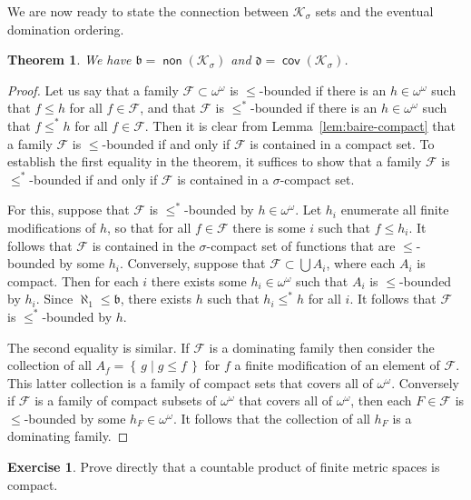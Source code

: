 \documentclass[11pt,oneside]{amsbook}
\newcommand{\set}[1]{\left\{\,#1\,\right\}}
\newcommand{\Ksigma}{\mathcal K_\sigma}
\DeclareMathOperator{\non}{\mathsf{non}}
\DeclareMathOperator{\cov}{\mathsf{cov}}
\theoremstyle{definition}
\newtheorem{exerc}{Exercise}[section]
\theoremstyle{plain}
\newtheorem{thm}{Theorem}[section]
\theoremstyle{definition}
\theoremstyle{remark}
\numberwithin{equation}{section}
\numberwithin{figure}{section}
\begin{document}
We are now ready to state the connection between $\Ksigma$ sets and the eventual domination ordering.

\begin{thm}
  \label{thm:bd-vs-ksigma}
  We have $\mathfrak b=\non(\Ksigma)$ and $\mathfrak d=\cov(\Ksigma)$.
\end{thm}

\begin{proof}
  Let us say that a family $\mathcal F\subset\omega^\omega$ is $\leq$-bounded if there is an $h\in\omega^\omega$ such that $f\leq h$ for all $f\in\mathcal F$, and that $\mathcal F$ is $\leq^*$-bounded if there is an $h\in\omega^\omega$ such that $f\leq^*h$ for all $f\in\mathcal F$. Then it is clear from Lemma~\ref{lem:baire-compact} that a family $\mathcal F$ is $\leq$-bounded if and only if $\mathcal F$ is contained in a compact set. To establish the first equality in the theorem, it suffices to show that a family $\mathcal F$ is $\leq^*$-bounded if and only if $\mathcal F$ is contained in a $\sigma$-compact set.

  For this, suppose that $\mathcal F$ is $\leq^*$-bounded by $h\in\omega^\omega$. Let $h_i$ enumerate all finite modifications of $h$, so that for all $f\in\mathcal F$ there is some $i$ such that $f\leq h_i$. It follows that $\mathcal F$ is contained in the $\sigma$-compact set of functions that are $\leq$-bounded by some $h_i$. Conversely, suppose that $\mathcal F\subset\bigcup A_i$, where each $A_i$ is compact. Then for each $i$ there exists some $h_i\in\omega^\omega$ such that $A_i$ is $\leq$-bounded by $h_i$. Since $\aleph_1\leq\mathfrak b$, there exists $h$ such that $h_i\leq^*h$ for all $i$. It follows that $\mathcal F$ is $\leq^*$-bounded by $h$.

  The second equality is similar. If $\mathcal F$ is a dominating family then consider the collection of all $A_f=\set{g\mid g\leq f}$ for $f$ a finite modification of an element of $\mathcal F$. This latter collection is a family of compact sets that covers all of $\omega^\omega$. Conversely if $\mathcal F$ is a family of compact subsets of $\omega^\omega$ that covers all of $\omega^\omega$, then each $F\in\mathcal F$ is $\leq$-bounded by some $h_F\in\omega^\omega$. It follows that the collection of all $h_F$ is a dominating family.
\end{proof}

\begin{exerc}
  Prove directly that a countable product of finite metric spaces is compact.
\end{exerc}
\end{document}
